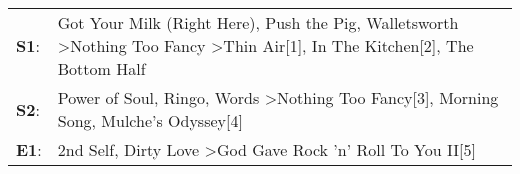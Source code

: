 \begin{supertabular}{p{0.03\textwidth}p{0.92\textwidth}}
 \textbf{S1}:  &  Got Your Milk (Right Here)\textsuperscript{}, \enspace Push the Pig\textsuperscript{}, \enspace Walletsworth\textsuperscript{} \textgreater \enspace Nothing Too Fancy\textsuperscript{} \textgreater \enspace Thin Air[1]\textsuperscript{}, \enspace In The Kitchen[2]\textsuperscript{}, \enspace The Bottom Half\textsuperscript{}  \enspace  \\
 \textbf{S2}:  &                                                                               Power of Soul\textsuperscript{}, \enspace Ringo\textsuperscript{}, \enspace Words\textsuperscript{} \textgreater \enspace Nothing Too Fancy[3]\textsuperscript{}, \enspace Morning Song\textsuperscript{}, \enspace Mulche's Odyssey[4]\textsuperscript{}  \enspace  \\
 \textbf{E1}:  &                                                                                                                                                                                           2nd Self\textsuperscript{}, \enspace Dirty Love\textsuperscript{} \textgreater \enspace God Gave Rock 'n' Roll To You II[5]\textsuperscript{}  \enspace  \\
\end{supertabular}
